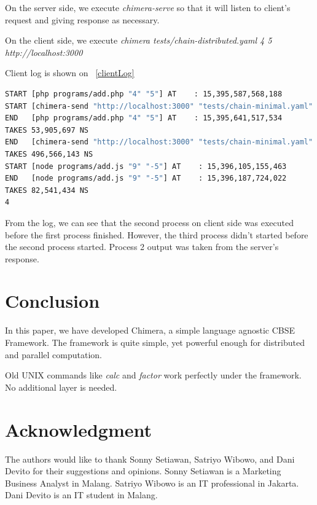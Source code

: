\documentclass[conference]{IEEEtran}
\begin{document}
On the server side, we execute {\it chimera-serve} so that it will listen to client's request
and giving response as necessary.

On the client side, we execute {\it chimera tests/chain-distributed.yaml 4 5 http://localhost:3000}

Client log is shown on ~\ref{clientLog} 

\begin{lstlisting}[caption=Client Log, label=clientLog, language=bash, basicstyle=\small, breaklines=true]
START [php programs/add.php "4" "5"] AT    : 15,395,587,568,188
START [chimera-send "http://localhost:3000" "tests/chain-minimal.yaml" "4" "5"] AT    : 15,395,607,233,624
END   [php programs/add.php "4" "5"] AT    : 15,395,641,517,534
TAKES 53,905,697 NS
END   [chimera-send "http://localhost:3000" "tests/chain-minimal.yaml" "4" "5"] AT    : 15,396,103,823,215
TAKES 496,566,143 NS
START [node programs/add.js "9" "-5"] AT    : 15,396,105,155,463
END   [node programs/add.js "9" "-5"] AT    : 15,396,187,724,022
TAKES 82,541,434 NS
4
\end{lstlisting}

From the log, we can see that the second process on client side was executed before the first process finished.
However, the third process didn't started before the second process started. Process 2 output was taken from the
server's response.

\section{Conclusion}

In this paper, we have developed Chimera, a simple language agnostic CBSE Framework. 
The framework is quite simple, yet powerful enough for distributed and parallel computation.

Old UNIX commands like {\it calc} and {\it factor} work perfectly under the framework.
No additional layer is needed.


\section*{Acknowledgment}

The authors would like to thank Sonny Setiawan, Satriyo Wibowo, and Dani Devito for
their suggestions and opinions. Sonny Setiawan is a Marketing Business Analyst in Malang.
Satriyo Wibowo is an IT professional in Jakarta. Dani Devito is an IT student in Malang.

\ifCLASSOPTIONcaptionsoff
  \newpage
\fi




\end{document}
